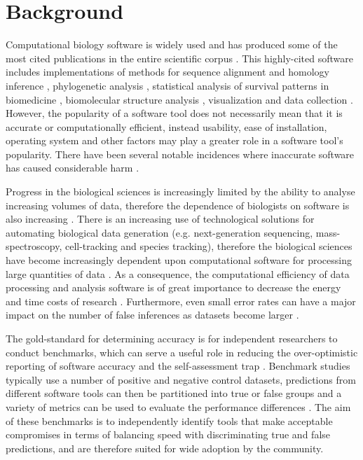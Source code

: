 \documentclass[fleqn,10pt]{SelfArx} %
\begin{document}
\section*{Background}
Computational biology software is widely used and has produced some of
the most cited publications in the entire scientific corpus
\cite{Perez-Iratxeta2007-lv,Van_Noorden2014-kc,Wren2016-xy}. This
highly-cited software includes implementations of methods for sequence
alignment and homology inference
\cite{Altschul1990-ht,Thompson1994-eu,Thompson1997-rl,Altschul1997-ga},
phylogenetic analysis
\cite{Felsenstein1985-lj,Saitou1987-zl,Posada1998-qq,Ronquist2003-yh,Tamura2007-ei},
statistical analysis of survival patterns in biomedicine
\cite{Kaplan1958-ju,Cox1972-nu}, biomolecular structure analysis
\cite{Sheldrick1990-kc,Sheldrick2008-xy,Jones1991-ik,Laskowski1993-vi,Otwinowski1997-xj},
visualization and data collection
\cite{Kraulis1991-lt,Berman2000-to}. However, the popularity of a
software tool does not necessarily mean that it is accurate or
computationally efficient, instead usability, ease of installation,
operating system and other factors may play a greater role in a software
tool's popularity. There have been several notable incidences where
inaccurate software has caused considerable harm
\cite{leveson1993investigation}.

Progress in the biological sciences is increasingly limited by the
ability to analyse increasing volumes of data, therefore the
dependence of biologists on software is also increasing
\cite{Marx2013-zi}. There is an increasing use of technological
solutions for automating biological data generation
(e.g. next-generation sequencing, mass-spectroscopy, cell-tracking and
species tracking), therefore the biological sciences have become
increasingly dependent upon computational software for processing
large quantities of data \cite{Marx2013-zi}. As a consequence, the
computational efficiency of data processing and analysis software is
of great importance to decrease the energy and time costs of research
\cite{Gombiner2011-md}. Furthermore, even small error rates can have a
major impact on the number of false inferences as datasets become
larger \cite{Storey2003-cv}.

The gold-standard for determining accuracy is for independent
researchers to conduct benchmarks, which can serve a useful role in
reducing the over-optimistic reporting of software accuracy
\cite{Boulesteix2010-te,Jelizarow2010-zf,Weber:2019} and the self-assessment trap
\cite{Norel2011-cq,Buchka:2021}. Benchmark studies typically use a number of
positive and negative control datasets, predictions from different software tools can then be
partitioned into true or false groups and a variety of metrics can be
used to evaluate the performance differences
\cite{Egan1975-nd,Hall2012-kg,Weber:2019}.
The aim of these benchmarks is to independently identify tools that
make acceptable compromises in terms of balancing speed with
discriminating true and false predictions, and are therefore suited
for wide adoption by the community.
\end{document}
